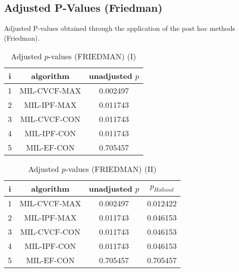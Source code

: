 \documentclass[a4paper,10pt]{article}
\begin{document}
\begin{landscape}
\newpage

\section{Adjusted P-Values (Friedman)}


Adjusted P-values obtained through the application of the post hoc methods (Friedman).

\begin{table}[!htp]
\centering\small
\begin{tabular}{ccc}
i&algorithm&unadjusted $p$\\
\hline1&MIL-CVCF-MAX&0.002497\\2&MIL-IPF-MAX&0.011743\\3&MIL-CVCF-CON&0.011743\\4&MIL-IPF-CON&0.011743\\5&MIL-EF-CON&0.705457\\\hline
\end{tabular}
\caption{Adjusted $p$-values (FRIEDMAN) (I)}
\end{table}
\begin{table}[!htp]
\centering\small
\begin{tabular}{cccc}
i&algorithm&unadjusted $p$&$p_{Holland}$\\
\hline1&MIL-CVCF-MAX&0.002497&0.012422\\2&MIL-IPF-MAX&0.011743&0.046153\\3&MIL-CVCF-CON&0.011743&0.046153\\4&MIL-IPF-CON&0.011743&0.046153\\5&MIL-EF-CON&0.705457&0.705457\\\hline
\end{tabular}
\caption{Adjusted $p$-values (FRIEDMAN) (II)}
\end{table}

\newpage
\end{landscape}
\end{document}
